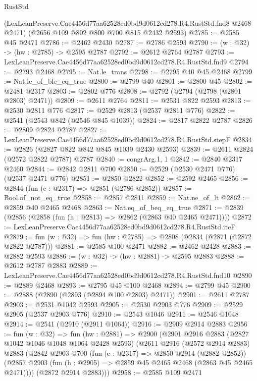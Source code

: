 \begin{lexlean}{RustStd}
\begin{coremodule}
    (LexLeanPreserve.Cae4456d77aa62528ed0bd9d0612cd278.R4.RustStd.fnd8 @2468 @2471)
    (@2656 @109 @802 @800 @700 @815 @2432 @2593)
@2785 := @2585 @45 @2471
@2786 := @2462 @2430
@2787 := @2786 @2593
@2790 := (w : @32) -> (hw : @2785) -> @2595 @2787
@2792 := @2612 @2764 @2787
@2793 := LexLeanPreserve.Cae4456d77aa62528ed0bd9d0612cd278.R4.RustStd.fnd9
@2794 := @2793 @2468
@2795 := Nat.le_trans
@2798 := @2795 @40 @45 @2468
@2799 := Nat.le_of_ble_eq_true
@2800 := @2799 @40
@2801 := @2800 @45
@2802 := @2481 @2317
@2803 := @2802 @776
@2808 := @2792 (@2794 (@2798 (@2801 @2803) @2471))
@2809 := @2611 @2764
@2811 := @2531 @822 @2593
@2813 := @2530 @2811 @776
@2817 := @2529 @2813 (@2537 @2811 @776)
@2822 := @2541 (@2543 @842 (@2546 @845 @1039))
@2824 := @2817 @2822 @2787
@2826 := @2809 @2824 @2787
@2827 := LexLeanPreserve.Cae4456d77aa62528ed0bd9d0612cd278.R4.RustStd.stepF
@2834 := @2826 (@2827 @822 @842 @845 @1039 @2430 @2593)
@2839 := @2611 @2824 (@2572 @2822 @2787) @2787
@2840 := congrArg.{1, 1}
@2842 := @2840 @2317 @2460
@2844 := @2842 @2811 @700
@2850 := @2529 (@2530 @2471 @776) (@2537 @2471 @776)
@2851 := @2850 @2822
@2852 := @2592 @2465
@2856 := @2844 (fun (c : @2317) => @2851 (@2786 @2852))
@2857 := Bool.of_not_eq_true
@2858 := @2857 @2811
@2859 := Nat.ne_of_lt
@2862 := @2859 @40 @2465 @2468
@2863 := Nat.eq_of_beq_eq_true
@2871 := @2839 (@2856 (@2858 (fun (h : @2813) => @2862 (@2863 @40 @2465 @2471))))
@2872 := LexLeanPreserve.Cae4456d77aa62528ed0bd9d0612cd278.R4.RustStd.iteF
@2879 := fun (w : @32) => fun (hw : @2785) => @2808 (@2834 (@2871 (@2872 @2822 @2787)))
@2881 := @2585 @100 @2471
@2882 := @2462 @2428
@2883 := @2882 @2593
@2886 := (w : @32) -> (hw : @2881) -> @2595 @2883
@2888 := @2612 @2787 @2883
@2889 := LexLeanPreserve.Cae4456d77aa62528ed0bd9d0612cd278.R4.RustStd.fnd10
@2890 := @2889 @2468
@2893 := @2795 @45 @100 @2468
@2894 := @2799 @45
@2900 := @2888 (@2890 (@2893 (@2894 @100 @2803) @2471))
@2901 := @2611 @2787
@2903 := @2531 @1042 @2593
@2905 := @2530 @2903 @776
@2909 := @2529 @2905 (@2537 @2903 @776)
@2910 := @2543 @1046
@2911 := @2546 @1048
@2914 := @2541 (@2910 (@2911 @1064))
@2916 := @2909 @2914 @2883
@2956 := fun (w : @32) =>
  fun (hw : @2881) =>
  @2900
    (@2901
      @2916
      @2883
      (@2827 @1042 @1046 @1048 @1064 @2428 @2593)
      (@2611
        @2916
        (@2572 @2914 @2883)
        @2883
        (@2842
          @2903
          @700
          (fun (c : @2317) => @2850 @2914 (@2882 @2852))
          (@2857 @2903 (fun (h : @2905) => @2859 @45 @2465 @2468 (@2863 @45 @2465 @2471))))
        (@2872 @2914 @2883)))
@2958 := @2585 @109 @2471

\end{coremodule}
\end{lexlean}
